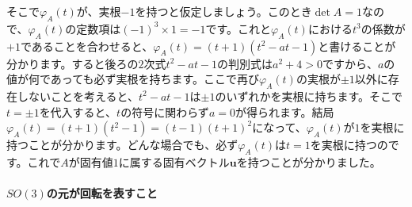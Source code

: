 そこで$\varphi_A(t)$が、実根$-1$を持つと仮定しましょう。このとき$\det A = 1$なので、$\varphi_A(t)$の定数項は$(-1)^3 \times 1 = -1$です。これと$\varphi_A(t)$における$t^3$の係数が$+1$であることを合わせると、$\varphi_A(t) = (t + 1)(t^2 - at - 1)$と書けることが分かります。すると後ろの$2$次式$t^2 - at - 1$の判別式は$a^2 + 4 > 0 $ですから、$a$の値が何であっても必ず実根を持ちます。ここで再び$\varphi_A(t)$の実根が$\pm1$以外に存在しないことを考えると、$t^2 - at - 1$は$\pm1$のいずれかを実根に持ちます。そこで$t = \pm1$を代入すると、$t$の符号に関わらず$a = 0$が得られます。結局$\varphi_A(t) = (t + 1)(t^2 - 1) = (t - 1) (t + 1)^2$になって、$\varphi_A(t)$が$1$を実根に持つことが分かります。どんな場合でも、必ず$\varphi_A(t)$は$t = 1$を実根に持つのです。これで$A$が固有値$1$に属する固有ベクトル$\bm{u}$を持つことが分かりました。

\paragraph{$SO(3)$の元が回転を表すこと}

